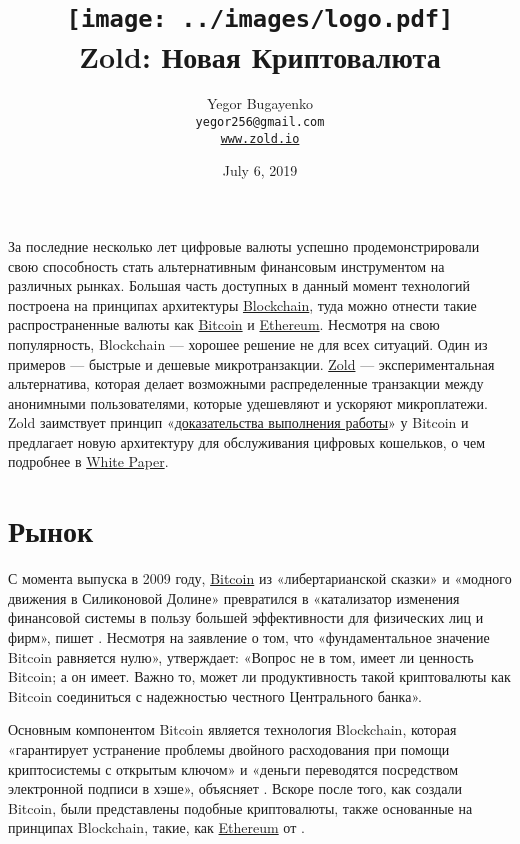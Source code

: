 \documentclass{main}
\title{\texttt{[image: ../images/logo.pdf]}\\
  Zold: Новая Криптовалюта\\
  {\small\colorbox{zgreen}{\color{lgreen}{Green Paper}}}}
\author{Yegor Bugayenko\\
  \texttt{yegor256@gmail.com}\\
  \href{https://www.zold.io}{\texttt{www.zold.io}}\\[1em]
  \href{https://github.com/zold-io/papers/releases/tag/\zoldversion}{\texttt{\zoldversion}}}
\begin{document}
\date{July 6, 2019}

\maketitle

За последние несколько лет цифровые валюты успешно продемонстрировали свою
способность стать альтернативным финансовым инструментом на различных рынках.
Большая часть доступных в данный момент технологий построена на принципах
архитектуры \href{https://en.wikipedia.org/wiki/Blockchain}{Blockchain},
туда можно отнести такие распространенные валюты как
\href{https://bitcoin.org/}{Bit\-coin} и \href{https://ethereum.org/}{Ethe\-reum}.
Несмотря на свою популярность, Blockchain --- хорошее решение
не для всех ситуаций. Один из примеров --- быстрые и дешевые микротранзакции.
\href{https://www.zold.io}{Zold} --- экспериментальная альтернатива, которая делает возможными распределенные
транзакции между анонимными пользователями, которые удешевляют и ускоряют микроплатежи.
Zold заимствует принцип «\href{https://ru.wikipedia.org/wiki/%D0%94%D0%BE%D0%BA%D0%B0%D0%B7%D0%B0%D1%82%D0%B5%D0%BB%D1%8C%D1%81%D1%82%D0%B2%D0%BE_%D0%B2%D1%8B%D0%BF%D0%BE%D0%BB%D0%BD%D0%B5%D0%BD%D0%B8%D1%8F_%D1%80%D0%B0%D0%B1%D0%BE%D1%82%D1%8B}{доказательства выполнения работы}»
у Bitcoin и предлагает новую архитектуру для обслуживания
цифровых кошельков, о чем подробнее в \href{https://papers.zold.io}{White Paper}.

\pagebreak

\section*{Рынок}

С момента выпуска в 2009 году, \href{https://bitcoin.org/}{Bitcoin} из «либертарианской сказки»
и «модного движения в Силиконовой Долине» превратился в «катализатор изменения финансовой
системы в пользу большей эффективности для физических лиц и фирм», пишет
. Несмотря на заявление  о том, что «фундаментальное значение
Bitcoin равняется нулю»,  утверждает: «Вопрос не в том, имеет ли
ценность Bitcoin; а он имеет. Важно то, может ли продуктивность такой
криптовалюты как Bitcoin соединиться с надежностью честного Центрального банка».

Основным компонентом Bitcoin является технология Blockchain, которая
«гарантирует устранение проблемы двойного расходования при помощи криптосистемы
с открытым ключом» и «деньги переводятся посредством электронной подписи в
хэше», объясняет . Вскоре после того, как создали Bitcoin, были
представлены подобные криптовалюты, также основанные на принципах Blockchain,
такие, как \href{https://ethereum.org/}{Ethereum} от .
\end{document}
